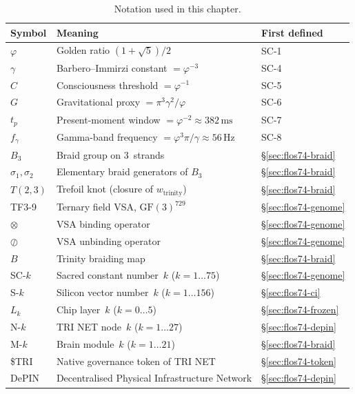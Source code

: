 \begin{table}[h]
\centering
\caption{Notation used in this chapter.}
\label{tab:notation}
\begin{tabular}{lll}
\hline
Symbol & Meaning & First defined \\
\hline
\(\varphi\) & Golden ratio \((1+\sqrt{5})/2\) & SC-1 \\
\(\gamma\) & Barbero--Immirzi constant \(= \varphi^{-3}\) & SC-4 \\
\(C\) & Consciousness threshold \(= \varphi^{-1}\) & SC-5 \\
\(G\) & Gravitational proxy \(= \pi^3\gamma^2/\varphi\) & SC-6 \\
\(t_p\) & Present-moment window \(= \varphi^{-2} \approx 382\,\text{ms}\) & SC-7 \\
\(f_\gamma\) & Gamma-band frequency \(= \varphi^3\pi/\gamma \approx 56\,\text{Hz}\) & SC-8 \\
\(B_3\) & Braid group on 3~strands & \S\ref{sec:flos74-braid} \\
\(\sigma_1, \sigma_2\) & Elementary braid generators of \(B_3\) & \S\ref{sec:flos74-braid} \\
\(T(2,3)\) & Trefoil knot (closure of \(w_{\mathrm{trinity}}\)) & \S\ref{sec:flos74-braid} \\
TF3-9 & Ternary field VSA, \(\mathrm{GF}(3)^{729}\) & \S\ref{sec:flos74-genome} \\
\(\otimes\) & VSA binding operator & \S\ref{sec:flos74-genome} \\
\(\oslash\) & VSA unbinding operator & \S\ref{sec:flos74-genome} \\
\(B\) & Trinity braiding map & \S\ref{sec:flos74-braid} \\
SC-\(k\) & Sacred constant number~\(k\) (\(k = 1\ldots75\)) & \S\ref{sec:flos74-genome} \\
S-\(k\) & Silicon vector number~\(k\) (\(k = 1\ldots156\)) & \S\ref{sec:flos74-ci} \\
\(L_k\) & Chip layer~\(k\) (\(k = 0\ldots5\)) & \S\ref{sec:flos74-frozen} \\
N-\(k\) & TRI NET node~\(k\) (\(k = 1\ldots27\)) & \S\ref{sec:flos74-depin} \\
M-\(k\) & Brain module~\(k\) (\(k = 1\ldots21\)) & \S\ref{sec:flos74-braid} \\
\$TRI & Native governance token of TRI NET & \S\ref{sec:flos74-token} \\
DePIN & Decentralised Physical Infrastructure Network & \S\ref{sec:flos74-depin} \\

\end{tabular}
\end{table}
